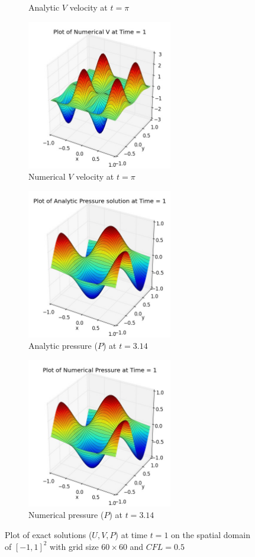 \begin{figure}[H]
\begin{subfigure}[t]{2.5in}
		\caption{Analytic $V$ velocity at $t=\pi$}\label{fig:6.1c}
	\end{subfigure}
	\quad
	\begin{subfigure}[t]{2.5in}
		\centering
		\includegraphics[width=2.5in]{figures/Pm1a_pf2_vf_t_1_grid_60 - Copy.jpg}
		\caption{Numerical $V$ velocity at $t=\pi$}\label{fig:6.1d}
	\end{subfigure}
	\quad	
	\begin{subfigure}[t]{2.5in}
		\centering
		\includegraphics[width=2.5in]{figures/Pm1a_pf2_P_exact_t_1_grid_60 - Copy.jpg}
		\caption{Analytic pressure ($P$) at $t=3.14$}\label{fig:6.1e}
	\end{subfigure}
	\quad	
	\begin{subfigure}[t]{2.5in}
		\centering
		\includegraphics[width=2.5in]{figures/Pm1a_pf2_pf_t_1_grid_60 - Copy.jpg}
		\caption{Numerical pressure ($P$) at $t=3.14$}\label{fig:6.1f}
	\end{subfigure}
	\caption{Plot of exact solutions ($U,V,P$) at time $t=1$ on the spatial domain of $[-1,1]^2$ with grid size $60 \times 60$ and $CFL=0.5$}\label{fig:6.1}
\end{figure}

